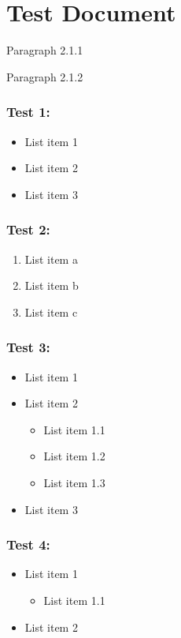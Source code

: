 \documentclass[11pt,a4paper]{article}
\begin{document}
\section{Test Document}

Paragraph 2.1.1

Paragraph 2.1.2

\subsubsection{Test 1:}

\begin{itemize}
\item List item 1
\item List item 2
\item List item 3
\end{itemize}

\subsubsection{Test 2:}

\begin{enumerate}
\item List item a
\item List item b
\item List item c
\end{enumerate}

\subsubsection{Test 3:}

\begin{itemize}
\item List item 1
\item List item 2
  \begin{itemize}
\item List item 1.1
\item List item 1.2
\item List item 1.3
  \end{itemize}
\item List item 3
\end{itemize}

\subsubsection{Test 4:}

\begin{itemize}
\item List item 1
  \begin{itemize}
\item List item 1.1
  \end{itemize}
\item List item 2
\end{itemize}
\end{document}

